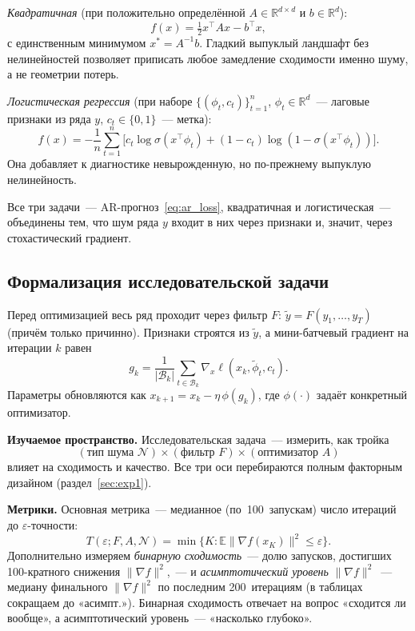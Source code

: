 \documentclass[conference]{IEEEtran}
\begin{document}
\emph{Квадратичная} (при положительно определённой $A\in\mathbb{R}^{d\times d}$
и $b\in\mathbb{R}^d$):
\begin{equation}
  f(x) = \tfrac{1}{2}x^\top A x - b^\top x,
  \label{eq:quadratic}
\end{equation}
с единственным минимумом $x^* = A^{-1}b$. Гладкий выпуклый ландшафт без
нелинейностей позволяет приписать любое замедление сходимости именно
шуму, а не геометрии потерь.

\emph{Логистическая регрессия} (при наборе $\{(\phi_t,c_t)\}_{t=1}^n$,
$\phi_t\in\mathbb{R}^d$~--- лаговые признаки из ряда $y$,
$c_t\in\{0,1\}$~--- метка):
\begin{equation}
  f(x) = -\frac{1}{n}\sum_{t=1}^{n}
    \bigl[c_t\log\sigma(x^\top\phi_t)
         +(1-c_t)\log(1-\sigma(x^\top\phi_t))\bigr].
  \label{eq:logreg}
\end{equation}
Она добавляет к диагностике невырожденную, но по-прежнему выпуклую
нелинейность.

Все три задачи~--- AR-прогноз~\eqref{eq:ar_loss}, квадратичная и
логистическая~--- объединены тем, что шум ряда $y$ входит в них через
признаки и, значит, через стохастический градиент.

\subsection{Формализация исследовательской задачи}
\label{sec:research}

Перед оптимизацией весь ряд проходит через фильтр $F$:
$\tilde{y} = F(y_1,\dots,y_T)$ (причём только причинно). Признаки строятся
из $\tilde{y}$, а мини-батчевый градиент на итерации $k$ равен
\begin{equation}
  g_k = \frac{1}{|\mathcal{B}_k|}\sum_{t\in\mathcal{B}_k}
        \nabla_x\ell(x_k,\tilde{\phi}_t,c_t).
  \label{eq:grad}
\end{equation}
Параметры обновляются как $x_{k+1}=x_k-\eta\,\phi(g_k)$, где $\phi(\cdot)$
задаёт конкретный оптимизатор.

\textbf{Изучаемое пространство.} Исследовательская задача~--- измерить, как
тройка
\[
  (\text{тип шума }\mathcal{N})\times(\text{фильтр }F)\times(\text{оптимизатор }A)
\]
влияет на сходимость и качество. Все три оси перебираются полным
факторным дизайном (раздел~\ref{sec:exp1}).

\textbf{Метрики.} Основная метрика~--- медианное (по~100~запускам) число
итераций до $\varepsilon$-точности:
\begin{equation}
  T(\varepsilon;F,A,\mathcal{N})
  = \min\{K:\mathbb{E}\|\nabla f(x_K)\|^2\le\varepsilon\}.
  \label{eq:metric}
\end{equation}
Дополнительно измеряем \emph{бинарную сходимость}~--- долю запусков,
достигших 100-кратного снижения $\|\nabla f\|^2$,~--- и
\emph{асимптотический уровень} $\|\nabla f\|^2$~--- медиану финального
$\|\nabla f\|^2$ по последним 200~итерациям (в таблицах сокращаем до
«асимпт.»). Бинарная сходимость отвечает на вопрос «сходится ли вообще»,
а асимптотический уровень~--- «насколько глубоко».
\end{document}
